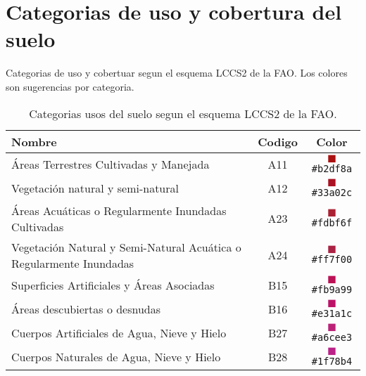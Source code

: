 \documentclass[hidelinks,12pt]{article}
\begin{document}
\section{Categorias de uso y cobertura del suelo}\label{apcate}
Categorias de uso y cobertuar segun el esquema LCCS2 de la FAO\@. Los colores son
sugerencias por categoria.
\begin{table}[hbt]
    \centering
    \begin{tabular}{p{11cm}cc}
        \toprule
        Nombre & Codigo & Color \\
        \midrule 
        Áreas Terrestres Cultivadas y Manejada & A11 & \textcolor{A11}{$\blacksquare$}\texttt{\#b2df8a}
        \\
        Vegetación natural y semi-natural & A12 & \textcolor{A12}{$\blacksquare$}\texttt{\#33a02c}\\
        Áreas Acuáticas o Regularmente Inundadas Cultivadas & A23  &
        \textcolor{A23}{$\blacksquare$}\texttt{\#fdbf6f}\\
        Vegetación Natural y Semi-Natural Acuática o
	Regularmente Inundadas & A24 & \textcolor{A24}{$\blacksquare$}\texttt{\#ff7f00}\\
        Superficies Artificiales y Áreas Asociadas & B15  &
        \textcolor{B15}{$\blacksquare$}\texttt{\#fb9a99}\\
        Áreas descubiertas o desnudas & B16 & \textcolor{B16}{$\blacksquare$}\texttt{\#e31a1c}\\
        Cuerpos Artificiales de Agua, Nieve y Hielo & B27 &
        \textcolor{B27}{$\blacksquare$}\texttt{\#a6cee3}\\
        Cuerpos Naturales de Agua, Nieve y Hielo & B28&
        \textcolor{B28}{$\blacksquare$}\texttt{\#1f78b4}\\
        \bottomrule
    \end{tabular}
\caption{\label{tabla1}Categorias usos del suelo segun el esquema LCCS2 de la
FAO.}
\end{table}


\end{document}
